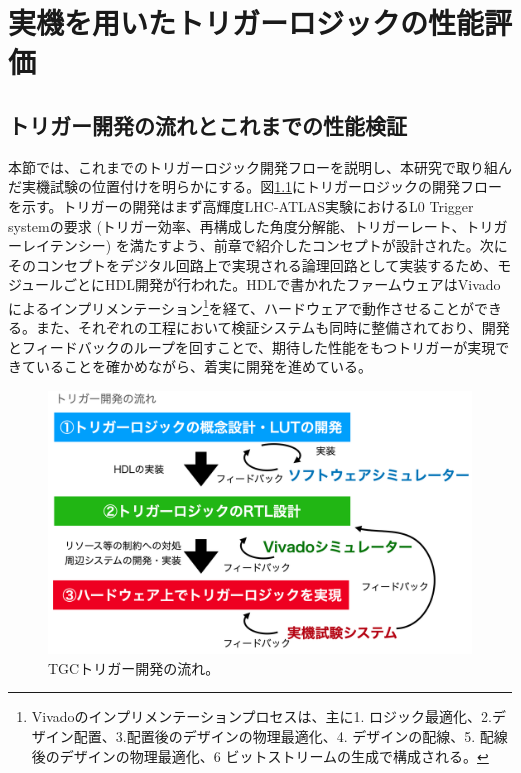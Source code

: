 \chapter{実機を用いたトリガーロジックの性能評価}
\label{chap_TriggerTest}

\section{トリガー開発の流れとこれまでの性能検証}
\label{sec_TriggerTestSystem}
本節では、これまでのトリガーロジック開発フローを説明し、本研究で取り組んだ実機試験の位置付けを明らかにする。図\ref{Develop_flow}にトリガーロジックの開発フローを示す。トリガーの開発はまず高輝度LHC-ATLAS実験におけるL0 Trigger systemの要求 (トリガー効率、再構成した角度分解能、トリガーレート、トリガーレイテンシー) を満たすよう、前章で紹介したコンセプトが設計された。次にそのコンセプトをデジタル回路上で実現される論理回路として実装するため、モジュールごとにHDL開発が行われた。HDLで書かれたファームウェアはVivadoによるインプリメンテーション\footnote{Vivadoのインプリメンテーションプロセスは、主に1. ロジック最適化、2.デザイン配置、3.配置後のデザインの物理最適化、4. デザインの配線、5. 配線後のデザインの物理最適化、6 ビットストリームの生成で構成される。}を経て、ハードウェアで動作させることができる。また、それぞれの工程において検証システムも同時に整備されており、開発とフィードバックのループを回すことで、期待した性能をもつトリガーが実現できていることを確かめながら、着実に開発を進めている。

\begin{figure} 
\centering
\includegraphics[width=16cm]{fig/Test/Develop_flow.png}
\caption[TGCトリガー開発の流れ]{TGCトリガー開発の流れ。}
\label{Develop_flow}
\end{figure}

